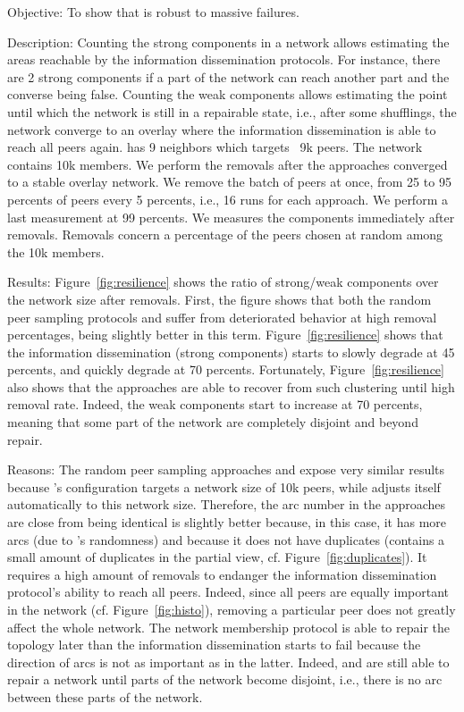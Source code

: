 \begin{asparadesc}
\item[Objective:] To show that \SPRAY is robust to massive failures.
\item[Description:] Counting the strong components in a network allows
  estimating the areas reachable by the information dissemination protocols. For
  instance, there are 2 strong components if a part of the network can reach
  another part and the converse being false.  Counting the weak components
  allows estimating the point until which the network is still in a repairable
  state, i.e., after some shufflings, the network converge to an overlay where
  the information dissemination is able to reach all peers again. \CYCLON has 9
  neighbors which targets ~9k peers. The network contains 10k members. We
  perform the removals after the approaches converged to a stable overlay
  network. We remove the batch of peers at once, from 25 to 95 percents of peers
  every 5 percents, i.e., 16 runs for each approach. We perform a last
  measurement at 99 percents. We measures the components immediately after
  removals. Removals concern a percentage of the peers chosen at random among
  the 10k members.
\item[Results:] Figure~\ref{fig:resilience} shows the ratio of strong/weak
  components over the network size after removals. First, the figure shows
  that both the random peer sampling protocols \SPRAY and \CYCLON suffer from
  deteriorated behavior at high removal percentages, \CYCLON being slightly
  better in this term. Figure~\ref{fig:resilience} shows that the information
  dissemination (strong components) starts to slowly degrade at 45 percents,
  and quickly degrade at 70 percents. Fortunately, Figure~\ref{fig:resilience}
  also shows that the approaches are able to recover from such clustering until
  high removal rate. Indeed, the weak components start to increase at 70
  percents, meaning that some part of the network are completely disjoint and
  beyond repair.
\item[Reasons:] The random peer sampling approaches \CYCLON and \SPRAY expose
  very similar results because \CYCLON's configuration targets a network size
  of 10k peers, while \SPRAY adjusts itself automatically to this network size.
  Therefore, the arc number in the approaches are close from being identical
  \CYCLON is slightly better because, in this case, it has more arcs (due to
  \SPRAY's randomness) and because it does not have duplicates (\SPRAY contains
  a small amount of duplicates in the partial view,
  cf. Figure~\ref{fig:duplicates}). It requires a high amount of removals
  to endanger the information dissemination protocol's ability to reach all
  peers. Indeed, since all peers are equally important in the network
  (cf. Figure~\ref{fig:histo}), removing a particular peer does not greatly
  affect the whole network. The network membership protocol is able to repair
  the topology later than the information dissemination starts to fail because
  the direction of arcs is not as important as in the latter. Indeed, \CYCLON
  and \SPRAY are still able to repair a network until parts of the network
  become disjoint, i.e., there is no arc between these parts of the network.
\end{asparadesc}

